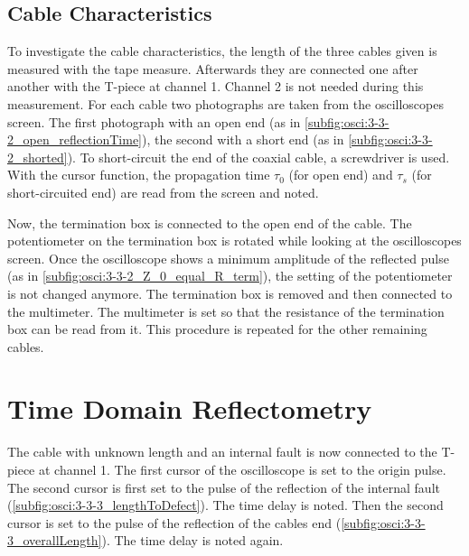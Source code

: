         \subsection{Cable Characteristics}\label{subsec:exec:cable_char}
            To investigate the cable characteristics, the length of the three cables given is measured with the tape measure.
            Afterwards they are connected one after another with the T-piece at channel 1. Channel 2 is not needed during this
            measurement. For each cable two photographs are taken from the oscilloscopes screen. The first photograph with an open
            end (as in \cref{subfig:osci:3-3-2_open_reflectionTime}), the second with a short end (as in \cref{subfig:osci:3-3-2_shorted}).
            To short-circuit the end of the coaxial cable, a screwdriver is used. With the cursor function, the propagation
            time \(\tau_0\) (for open end) and \(\tau_s\) (for short-circuited end) are read from the screen and noted.\par
            Now, the termination box is connected to the open end of the cable. The potentiometer on the termination box is rotated
            while looking at the oscilloscopes screen. Once the oscilloscope shows a minimum amplitude of the reflected pulse (as in \cref{subfig:osci:3-3-2_Z_0_equal_R_term}), the
            setting of the potentiometer is not changed anymore. The termination box is removed and then connected to the multimeter.
            The multimeter is set so that the resistance of the termination box can be read from it. This procedure is repeated for
            the other remaining cables.
    \section{Time Domain Reflectometry}\label{subsec:exec:TDR}
        The cable with unknown length and an internal fault is now connected to the T-piece at channel 1. The first cursor of the
        oscilloscope is set to the origin pulse. The second cursor is first set to the pulse of the reflection of the internal
        fault (\cref{subfig:osci:3-3-3_lengthToDefect}). The time delay is noted. Then the second cursor is set to the pulse
        of the reflection of the cables end (\cref{subfig:osci:3-3-3_overallLength}). The time delay is noted again.